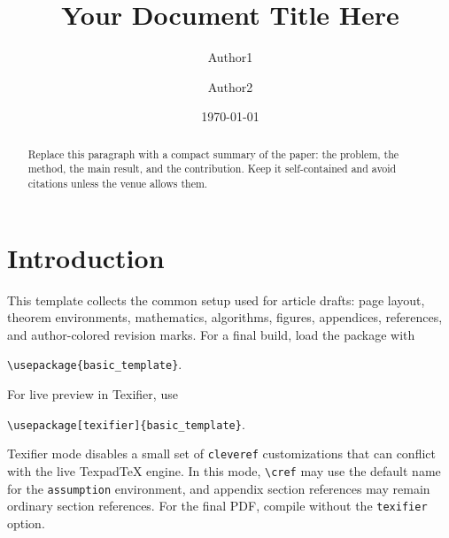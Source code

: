 \documentclass[letterpaper,12pt]{article}
\begin{document}
\title{\textbf{Your Document Title Here}}

\author{Author1\footnotemark[1] \and Author2\footnotemark[2]}



\date{\today}


\maketitle

\begin{abstract}
    Replace this paragraph with a compact summary of the paper: the problem, the method, the main result, and the contribution. Keep it self-contained and avoid citations unless the venue allows them.
\end{abstract}


\section{Introduction}

This template collects the common setup used for article drafts: page layout, theorem environments, mathematics, algorithms, figures, appendices, references, and author-colored revision marks. For a final build, load the package with

\verb|\usepackage{basic_template}|.

For live preview in Texifier, use

\verb|\usepackage[texifier]{basic_template}|.

Texifier mode disables a small set of \texttt{cleveref} customizations that can conflict with the live TexpadTeX engine. In this mode, \verb|\cref| may use the default name for the \texttt{assumption} environment, and appendix section references may remain ordinary section references. For the final PDF, compile without the \texttt{texifier} option.
\end{document}
